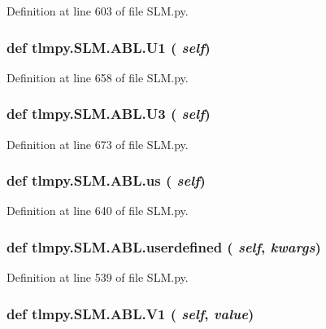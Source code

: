 Definition at line 603 of file SLM.py.\hypertarget{classtlmpy_1_1SLM_1_1ABL_a6257a0025ae59e5c8c63e2d8e0e2b06b}{
\subsubsection[{U1}]{\setlength{\rightskip}{0pt plus 5cm}def tlmpy.SLM.ABL.U1 ( {\em self})}}
\label{classtlmpy_1_1SLM_1_1ABL_a6257a0025ae59e5c8c63e2d8e0e2b06b}


Definition at line 658 of file SLM.py.\hypertarget{classtlmpy_1_1SLM_1_1ABL_a6718bd4ccfb951a0ef15e66ed6322176}{
\subsubsection[{U3}]{\setlength{\rightskip}{0pt plus 5cm}def tlmpy.SLM.ABL.U3 ( {\em self})}}
\label{classtlmpy_1_1SLM_1_1ABL_a6718bd4ccfb951a0ef15e66ed6322176}


Definition at line 673 of file SLM.py.\hypertarget{classtlmpy_1_1SLM_1_1ABL_ae58d7d35afb4d3ef97905bcaf73a728c}{
\subsubsection[{us}]{\setlength{\rightskip}{0pt plus 5cm}def tlmpy.SLM.ABL.us ( {\em self})}}
\label{classtlmpy_1_1SLM_1_1ABL_ae58d7d35afb4d3ef97905bcaf73a728c}


Definition at line 640 of file SLM.py.\hypertarget{classtlmpy_1_1SLM_1_1ABL_ac60535ffc09e0bb3c4c0f322fc897362}{
\subsubsection[{userdefined}]{\setlength{\rightskip}{0pt plus 5cm}def tlmpy.SLM.ABL.userdefined ( {\em self}, \/   {\em kwargs})}}
\label{classtlmpy_1_1SLM_1_1ABL_ac60535ffc09e0bb3c4c0f322fc897362}


Definition at line 539 of file SLM.py.\hypertarget{classtlmpy_1_1SLM_1_1ABL_a253d7972ac7b0e2c1e7d7ab6bb4ee36c}{
\subsubsection[{V1}]{\setlength{\rightskip}{0pt plus 5cm}def tlmpy.SLM.ABL.V1 ( {\em self}, \/   {\em value})}}
\label{classtlmpy_1_1SLM_1_1ABL_a253d7972ac7b0e2c1e7d7ab6bb4ee36c}


